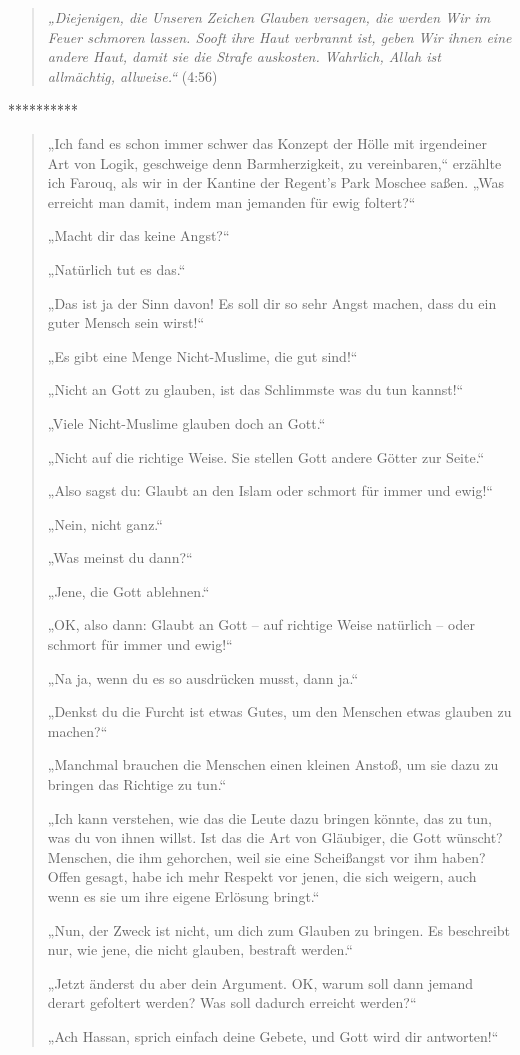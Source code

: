\documentclass[12pt]{memoir}
\newcommand{\QRef}[1]{{\color{darkblue}#1}}
\begin{document}
\begin{quote}
\emph{%
„Diejenigen, die Unseren Zeichen Glauben versagen,
die werden Wir im Feuer schmoren lassen.
Sooft ihre Haut verbrannt ist, geben Wir ihnen eine andere Haut,
damit sie die Strafe auskosten.
Wahrlich, Allah ist allmächtig, allweise.“} (\QRef{4:56})
\end{quote}

**********

\begin{quote}
„Ich fand es schon immer schwer das Konzept der Hölle
mit irgendeiner Art von Logik, geschweige denn Barmherzigkeit,
zu vereinbaren,“
erzählte ich Farouq, als wir in der Kantine der Regent’s Park Moschee saßen.
„Was erreicht man damit, indem man jemanden für ewig foltert?“

„Macht dir das keine Angst?“

„Natürlich tut es das.“

„Das ist ja der Sinn davon!
Es soll dir so sehr Angst machen, dass du ein guter Mensch sein wirst!“

„Es gibt eine Menge Nicht-Muslime, die gut sind!“

„Nicht an Gott zu glauben, ist das Schlimmste was du tun kannst!“

„Viele Nicht-Muslime glauben doch an Gott.“

„Nicht auf die richtige Weise.
Sie stellen Gott andere Götter zur Seite.“

„Also sagst du: Glaubt an den Islam
oder schmort für immer und ewig!“

„Nein, nicht ganz.“

„Was meinst du dann?“

„Jene, die Gott ablehnen.“

„OK, also dann: Glaubt an Gott – auf richtige Weise natürlich –
oder schmort für immer und ewig!“

„Na ja, wenn du es so ausdrücken musst, dann ja.“

„Denkst du die Furcht ist etwas Gutes,
um den Menschen etwas glauben zu machen?“

„Manchmal brauchen die Menschen einen kleinen Anstoß,
um sie dazu zu bringen das Richtige zu tun.“

„Ich kann verstehen, wie das die Leute dazu bringen könnte,
das zu tun, was du von ihnen willst.
Ist das die Art von Gläubiger, die Gott wünscht?
Menschen, die ihm gehorchen, weil sie eine Scheißangst vor ihm haben?
Offen gesagt, habe ich mehr Respekt vor jenen, die sich weigern,
auch wenn es sie um ihre eigene Erlösung bringt.“

„Nun, der Zweck ist nicht, um dich zum Glauben zu bringen.
Es beschreibt nur, wie jene, die nicht glauben, bestraft werden.“

„Jetzt änderst du aber dein Argument.
OK, warum soll dann jemand derart gefoltert werden?
Was soll dadurch erreicht werden?“

„Ach Hassan, sprich einfach deine Gebete, und Gott wird dir antworten!“
\end{quote}
\end{document}
